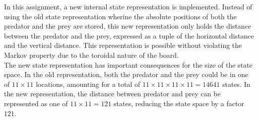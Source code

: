 In this assignment, a new internal state representation is implemented. Instead of using the old state representation wherine the absolute positions of both the predator and the prey are stored, this new representation only holds the distance between the predator and the prey, expressed as a tuple of the horizontal distance and the vertical distance. This representation is possible without violating the Markov property due to the toroidal nature of the board. \\

The new state representation has important consequences for the size of the state space. In the old representation, both the predator and the prey could be in one of $11 \times 11$ locations, amounting for a total of $11 \times 11 \times 11 \times 11 = 14641$ states. In the new representation, the distance between predator and prey can be represented as one of $11 \times 11 = 121$ states, reducing the state space by a factor $121$.